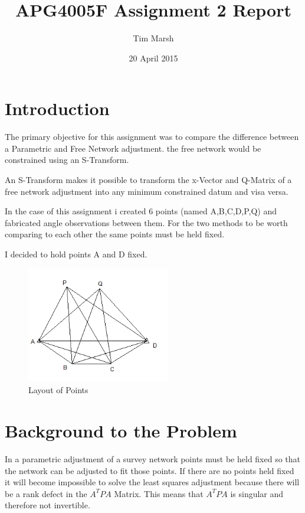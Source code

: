 \documentclass[11pt,a4paper]{article}
\title{APG4005F Assignment 2 Report}
\date{20 April 2015}
\author{Tim Marsh}
\begin{document}
	
	\maketitle
	\newpage
	\tableofcontents
	\listoffigures
	\newpage
	
	
	\section{Introduction}
	
	The primary objective for this assignment was to compare the difference between a Parametric and Free Network adjustment. the free network would be constrained using an S-Transform.
	
	An S-Transform makes it possible to transform the x-Vector and Q-Matrix of a free network adjustment into any minimum constrained datum and visa versa.
	
	In the case of this assignment i created 6 points (named A,B,C,D,P,Q) and fabricated angle observations between them. For the two methods to be worth comparing to each other the same points must be held fixed.
	
	I decided to hold points A and D fixed.

	\begin{figure}[H]
	\centering
	\includegraphics[width=0.5\linewidth]{./unnamed}
	\caption{Layout of Points}
	\label{fig:LayoutofPoints}
	\end{figure}

	
	\section{Background to the Problem}
	
	In a parametric adjustment of a survey network points must be held fixed so that the network can be adjusted to fit those points. If there are no points held fixed it will become impossible to solve the least squares adjustment because there will be a rank defect in the $A^TPA$ Matrix. This means that $A^TPA$ is singular and therefore not invertible.
	
\end{document}
